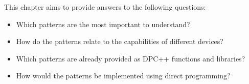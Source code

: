 This chapter aims to provide answers to the following questions:\par

\begin{itemize}
	\item Which patterns are the most important to understand?
	\item How do the patterns relate to the capabilities of different devices?
	\item Which patterns are already provided as DPC++ functions and libraries?
	\item How would the patterns be implemented using direct programming?
\end{itemize}










